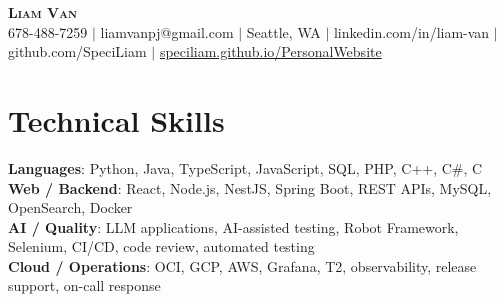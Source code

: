 \documentclass[letterpaper,11pt]{article}
\begin{document}

%
\begin{center}
    \textbf{\Huge \scshape Liam Van} \\ \vspace{1pt}
    \small 678-488-7259 $|$ \small {liamvanpj@gmail.com} $|$ Seattle, WA
 {{$|$ linkedin.com/in/liam-van} {$|$ github.com/SpeciLiam} {$|$ \href{https://speciliam.github.io/PersonalWebsite}{speciliam.github.io/PersonalWebsite}}}

\end{center}

\section{Technical Skills}
 \begin{itemize}[leftmargin=0.15in, label={}]
    \small{\item{
     \textbf{Languages}{: Python, Java, TypeScript, JavaScript, SQL, PHP, C++, C\#, C} \\
     \textbf{Web / Backend}{: React, Node.js, NestJS, Spring Boot, REST APIs, MySQL, OpenSearch, Docker} \\
     \textbf{AI / Quality}{: LLM applications, AI-assisted testing, Robot Framework, Selenium, CI/CD, code review, automated testing} \\
     \textbf{Cloud / Operations}{: OCI, GCP, AWS, Grafana, T2, observability, release support, on-call response} \\
    }}
 \end{itemize}
%
\end{document}

